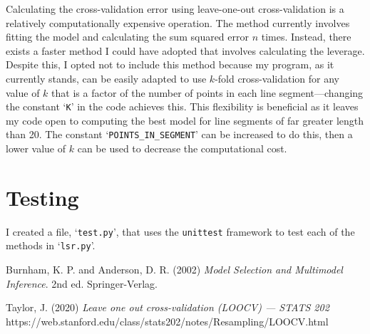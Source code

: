 \documentclass[onecolumn, 12pt, a4paper]{article}
\begin{document}
Calculating the cross-validation error using leave-one-out
cross-validation is a relatively computationally expensive operation.
The method currently involves
fitting the model and calculating the sum squared error
$n$ times. 
Instead, there exists a faster method I could have
adopted that involves calculating the leverage.
Despite this, I opted not to include this method 
because my program, as it currently stands, can be 
easily adapted to use $k$-fold cross-validation for 
any value of $k$ that is a factor of the number of points in each line segment---changing
the constant `\texttt{K}' in the code achieves this.
This flexibility is beneficial as it leaves my code open to
computing the best model for line segments of far greater length than 20.
The constant `\texttt{POINTS\_IN\_SEGMENT}' can be increased to do this,
then a lower value of $k$ can be used to decrease the computational cost.

\section{Testing}

I created a file, `\texttt{test.py}', that uses the
\texttt{unittest} framework to test each of the methods
in `\texttt{lsr.py}'.

\clearpage
\begin{thebibliography}{9}

    Burnham, K. P. and Anderson, D. R. (2002)
    \textit{Model Selection and Multimodel Inference}.
    2nd ed. Springer-Verlag.

    Taylor, J. (2020)
    \textit{Leave one out cross-validation (LOOCV) --- STATS 202}
    https://web.stanford.edu/class/stats202/notes/Resampling/LOOCV.html


\end{thebibliography}
    
\end{document}

